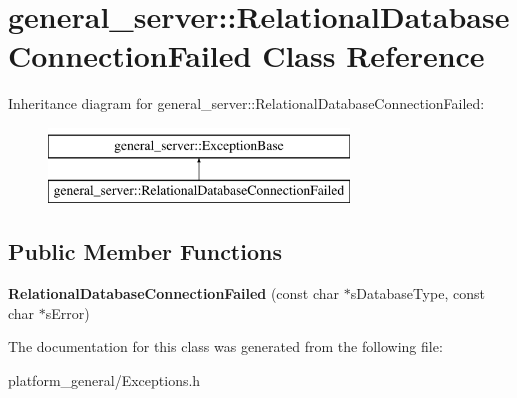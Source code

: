 \hypertarget{classgeneral__server_1_1RelationalDatabaseConnectionFailed}{\section{general\-\_\-server\-:\-:\-Relational\-Database\-Connection\-Failed \-Class \-Reference}
\label{classgeneral__server_1_1RelationalDatabaseConnectionFailed}
}
\-Inheritance diagram for general\-\_\-server\-:\-:\-Relational\-Database\-Connection\-Failed\-:\begin{figure}[H]
\begin{center}
\leavevmode
\includegraphics[height=2.000000cm]{classgeneral__server_1_1RelationalDatabaseConnectionFailed}
\end{center}
\end{figure}
\subsection*{\-Public \-Member \-Functions}
\begin{DoxyCompactItemize}
\item 
\hypertarget{classgeneral__server_1_1RelationalDatabaseConnectionFailed_a0c211d597ec090cf0267088c2fce597f}{{\bfseries \-Relational\-Database\-Connection\-Failed} (const char $\ast$s\-Database\-Type, const char $\ast$s\-Error)}\label{classgeneral__server_1_1RelationalDatabaseConnectionFailed_a0c211d597ec090cf0267088c2fce597f}

\end{DoxyCompactItemize}


\-The documentation for this class was generated from the following file\-:\begin{DoxyCompactItemize}
\item 
platform\-\_\-general/\-Exceptions.\-h\end{DoxyCompactItemize}
